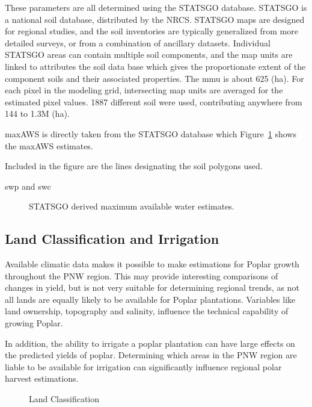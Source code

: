\documentclass[preprint,12pt]{elsarticle}
\begin{document}
These parameters are all determined using the \ac{STATSGO} database.
\ac{STATSGO} is a national soil database, distributed by the
\ac{NRCS}.  \ac{STATSGO} maps are designed for regional studies, and
the soil inventories are typically generalized from more detailed
surveys, or from a combination of ancillary datasets.  Individual
\ac{STATSGO} areas can contain multiple soil components, and the map
units are linked to attributes the soil data base which gives the
proportionate extent of the component soils and their associated
properties.  The \ac{mmu} is about 625 (ha).  For each pixel in the
modeling grid, intersecting map units are averaged for the estimated
pixel values.  1887 different soil were used, contributing anywhere
from 144 to 1.3M (ha).

\ac{maxAWS} is directly taken from the \ac{STATSGO} database which
Figure~\ref{fig:aws} shows the \ac{maxAWS} estimates.

Included in the figure are the lines designating the soil polygons
used.  

\ac{swp} and \ac{swc} 

\begin{figure}
  \centering
  
  \caption{\ac{STATSGO} derived maximum available water estimates. }
  \label{fig:aws}
\end{figure}


\subsection{Land Classification and Irrigation}
\label{sec:land}

Available climatic data makes it possible to make estimations for
Poplar growth throughout the \ac{PNW} region.  This may provide
interesting comparisons of changes in yield, but is not very suitable
for determining regional trends, as not all lands are equally likely
to be available for Poplar plantations.  Variables like land
ownership, topography and salinity, influence the technical capability
of growing Poplar.  

In addition, the ability to irrigate a poplar plantation can have
large effects on the predicted yields of poplar.  Determining which
areas in the \ac{PNW} region are liable to be available for irrigation
can significantly influence regional polar harvest estimations.  



\begin{figure}[hp]
  \centering
  
  \caption{Land Classification}
  \label{fig:land}
\end{figure}
\end{document}
